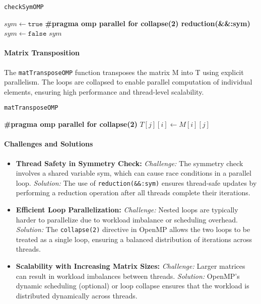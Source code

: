 \documentclass[conference]{IEEEtran}
\begin{document}
\begin{algorithm} \caption{\texttt{checkSymOMP}} \begin{algorithmic}[1] \State $sym \gets \texttt{true}$ \State \textbf{\#pragma omp parallel for collapse(2) reduction(\&\&:sym)}    \State $sym \gets \texttt{false}$ \EndIf \EndFor \EndFor \State \Return $sym$ \end{algorithmic} \end{algorithm}

\paragraph{Matrix Transposition} The \texttt{matTransposeOMP} function transposes the matrix M into T using explicit parallelism. The loops are collapsed to enable parallel computation of individual elements, ensuring high performance and thread-level scalability.

\begin{algorithm} \caption{\texttt{matTransposeOMP}} \begin{algorithmic}[1] \State \textbf{\#pragma omp parallel for collapse(2)}   \State $T[j][i] \gets M[i][j]$ \EndFor \EndFor \end{algorithmic} \end{algorithm}

\paragraph{Challenges and Solutions}

\begin{itemize} \item \textbf{Thread Safety in Symmetry Check:}
\textit{Challenge:} The symmetry check involves a shared variable 
sym, which can cause race conditions in a parallel loop.
\textit{Solution:} The use of \texttt{reduction(\&\&:sym)} ensures thread-safe updates by performing a reduction operation after all threads complete their iterations.
\item \textbf{Efficient Loop Parallelization:}  
\textit{Challenge:} Nested loops are typically harder to parallelize due to workload imbalance or scheduling overhead.  
\textit{Solution:} The \texttt{collapse(2)} directive in OpenMP allows the two loops to be treated as a single loop, ensuring a balanced distribution of iterations across threads.

\item \textbf{Scalability with Increasing Matrix Sizes:}  
\textit{Challenge:} Larger matrices can result in workload imbalances between threads.  
\textit{Solution:} OpenMP's dynamic scheduling (optional) or loop collapse ensures that the workload is distributed dynamically across threads.
\end{itemize}
\end{document}
